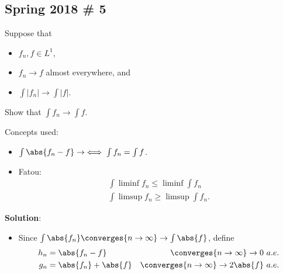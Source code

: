 \hypertarget{spring-2018-5}{%
\subsection{Spring 2018 \# 5}\label{spring-2018-5}}

Suppose that

\begin{itemize}
\tightlist
\item
  \(f_n, f \in L^1\),
\item
  \(f_n \to f\) almost everywhere, and
\item
  \(\int\left|f_{n}\right| \rightarrow \int|f|\).
\end{itemize}

Show that \(\int f_{n} \rightarrow \int f\).

\begin{solution}

Concepts used:

\begin{itemize}
\tightlist
\item
  \(\int \abs{f_n - f} \to \iff \int f_n = \int f\).
\item
  Fatou:
  \begin{align*}
  \int \liminf f_n \leq \liminf \int f_n \\
  \int \limsup f_n \geq \limsup \int f_n
  .\end{align*}
\end{itemize}

\textbf{Solution}:

\begin{itemize}
\item
  Since \(\int \abs{f_n} \converges{n\to\infty}\to \int \abs{f}\),
  define
  \begin{align*}
  h_n &= \abs{f_n - f} &\converges{n\to\infty}\to 0 ~a.e.\\
  g_n &= \abs{f_n} + \abs{f} &\converges{n\to\infty}\to 2\abs {f} ~a.e.
  \end{align*}


\end{itemize}
\end{solution}
